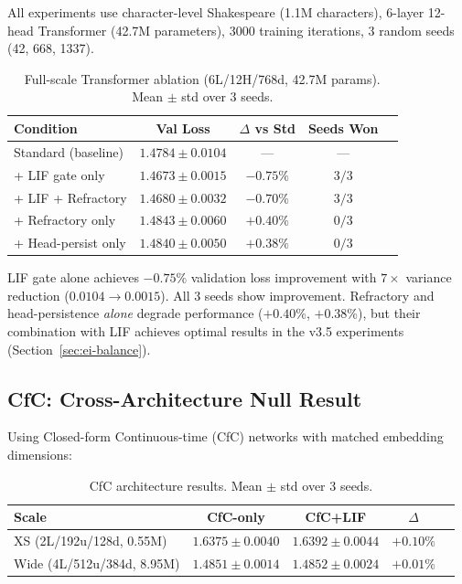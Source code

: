 \documentclass[11pt]{article}
\begin{document}
All experiments use character-level Shakespeare (1.1M characters), 6-layer 12-head Transformer (42.7M parameters), 3000 training iterations, 3 random seeds (42, 668, 1337).

\begin{table}[h]
\centering
\caption{Full-scale Transformer ablation (6L/12H/768d, 42.7M params). Mean $\pm$ std over 3 seeds.}
\label{tab:full-ablation}
\begin{tabular}{lcccc}
\toprule
\textbf{Condition} & \textbf{Val Loss} & \textbf{$\Delta$ vs Std} & \textbf{Seeds Won} \\
\midrule
Standard (baseline) & $1.4784 \pm 0.0104$ & --- & --- \\
+ LIF gate only & $1.4673 \pm 0.0015$ & $\mathbf{-0.75\%}$ & $3/3$ \\
+ LIF + Refractory & $1.4680 \pm 0.0032$ & $-0.70\%$ & $3/3$ \\
+ Refractory only & $1.4843 \pm 0.0060$ & $+0.40\%$ & $0/3$ \\
+ Head-persist only & $1.4840 \pm 0.0050$ & $+0.38\%$ & $0/3$ \\
\bottomrule
\end{tabular}
\end{table}

LIF gate alone achieves $-0.75\%$ validation loss improvement with $7\times$ variance reduction ($0.0104 \to 0.0015$). All 3 seeds show improvement. Refractory and head-persistence \emph{alone} degrade performance ($+0.40\%$, $+0.38\%$), but their combination with LIF achieves optimal results in the v3.5 experiments (Section~\ref{sec:ei-balance}).

\subsection{CfC: Cross-Architecture Null Result}

Using Closed-form Continuous-time (CfC) networks \cite{hasani2022closed} with matched embedding dimensions:

\begin{table}[h]
\centering
\caption{CfC architecture results. Mean $\pm$ std over 3 seeds.}
\label{tab:cfc}
\begin{tabular}{lcccc}
\toprule
\textbf{Scale} & \textbf{CfC-only} & \textbf{CfC+LIF} & \textbf{$\Delta$} \\
\midrule
XS (2L/192u/128d, 0.55M) & $1.6375 \pm 0.0040$ & $1.6392 \pm 0.0044$ & $+0.10\%$ \\
Wide (4L/512u/384d, 8.95M) & $1.4851 \pm 0.0014$ & $1.4852 \pm 0.0024$ & $+0.01\%$ \\
\bottomrule
\end{tabular}
\end{table}
\end{document}
